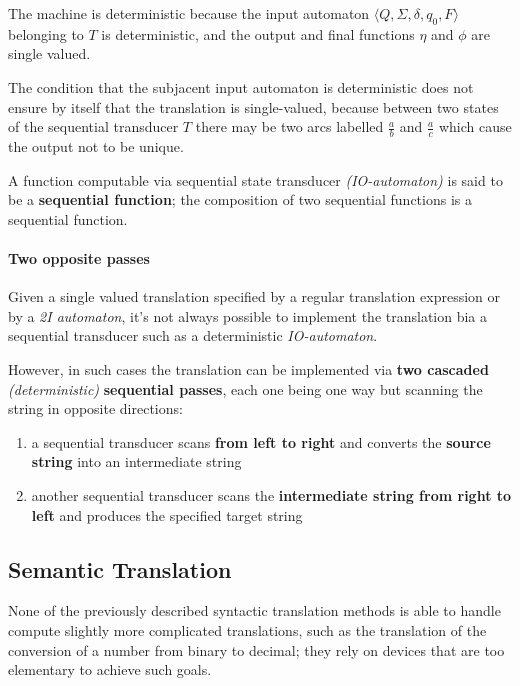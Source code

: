 \documentclass[english]{article}
\begin{document}
\bigskip
The machine is deterministic because the input automaton \(\langle Q, \Sigma, \delta, q_0, F \rangle\) belonging to \(T\) is deterministic, and the output and final functions \(\eta\) and \(\phi\) are single valued.

The condition that the subjacent input automaton is deterministic does not ensure by itself that the translation is single-valued, because between two states of the sequential transducer \(T\) there may be two arcs labelled \(\frac{a}{b}\) and \(\frac{a}{c}\) which cause the output not to be unique.

A function computable via sequential state transducer \textit{(IO-automaton)} is said to be a \textbf{sequential function};
the composition of two sequential functions is a sequential function.

\paragraph{Two opposite passes}

Given a single valued translation specified by a regular translation expression or by a \textit{2I automaton}, it's not always possible to implement the translation bia a sequential transducer such as a deterministic \textit{IO-automaton}.

However, in such cases the translation can be implemented via \textbf{two cascaded} \textit{(deterministic)} \textbf{sequential passes}, each one being one way but scanning the string in opposite directions:

\begin{enumerate}[label=step \arabic*., ref=(step \arabic*), leftmargin=*, widest=step 2.]
  \item a sequential transducer scans \textbf{from left to right} and converts the \textbf{source string} into an intermediate string
  \item another sequential transducer scans the \textbf{intermediate string from right to left} and produces the specified target string
\end{enumerate}

\subsection{Semantic Translation}

None of the previously described syntactic translation methods is able to handle compute slightly more complicated translations, such as the translation of the conversion of a number from binary to decimal;
they rely on devices that are too elementary to achieve such goals.
\end{document}
